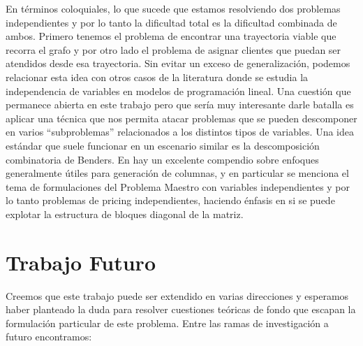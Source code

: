 En términos coloquiales, lo que sucede que estamos resolviendo dos problemas independientes y por lo tanto la dificultad total es la dificultad combinada de ambos. Primero tenemos el problema de encontrar una trayectoria viable que recorra el grafo y por otro lado el problema de asignar clientes que puedan ser atendidos desde esa trayectoria. Sin evitar un exceso de generalización, podemos relacionar esta idea con otros casos de la literatura donde se estudia la independencia de variables en modelos de programación lineal. Una cuestión que permanece abierta en este trabajo pero que sería muy interesante darle batalla es aplicar una técnica que nos permita atacar problemas que se pueden descomponer en varios ``subproblemas'' relacionados a los distintos tipos de variables. Una idea estándar que suele funcionar en un escenario similar es la descomposición combinatoria de Benders. En \cite{desrosiers2005primer} hay un excelente compendio sobre enfoques generalmente útiles para generación de columnas, y en particular se menciona el tema de formulaciones del Problema Maestro con variables independientes y por lo tanto problemas de pricing independientes, haciendo énfasis en si se puede explotar la estructura de bloques diagonal de la matriz. 


\section{Trabajo Futuro}

Creemos que este trabajo puede ser extendido en varias direcciones y esperamos haber planteado la duda para resolver cuestiones teóricas de fondo que escapan la formulación particular de este problema. Entre las ramas de investigación a futuro encontramos:

